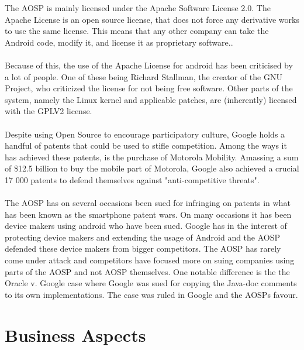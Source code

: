 \documentclass[conference]{IEEEtran}
\begin{document}
The AOSP is mainly licensed under the Apache Software License 2.0. The Apache License is an open source license, that does not force any derivative works to use the same license. This means that any other company can take the Android code, modify it, and license it as proprietary software.\cite{apache-license}. 
\\\\Because of this, the use of the Apache License for android has been criticised by a lot of people. One of these being Richard Stallman, the creator of the GNU Project, who criticized the license for not being free software.\cite{rms-android} Other parts of the system, namely the Linux kernel and applicable patches, are (inherently) licensed with the GPLV2 license.\cite{gplv2}\cite{android-licenses} 
\\\\Despite using Open Source to encourage participatory culture, Google holds a handful of patents that could be used to stifle competition.\cite{google-slide-unlock}\cite{google-radial-menu} Among the ways it has achieved these patents, is the purchase of Motorola Mobility. Amassing a sum of \$12.5 billion to buy the mobile part of Motorola, Google also achieved a crucial 17 000 patents to defend themselves against "anti-competitive threats".\cite{Goggin}
\\\\The AOSP has on several occasions been sued for infringing on patents in what has been known as the smartphone patent wars. On many occasions it has been device makers using android who have been sued.\cite{android-vApple} Google has in the interest of protecting device makers and extending the usage of Android and the AOSP defended these device makers from bigger competitors.\cite{google-helps} The AOSP has rarely come under attack and competitors have focused more on suing companies using parts of the AOSP and not AOSP themselves. One notable difference is the the Oracle v. Google case where Google was sued for copying the Java-doc comments to its own implementations.\cite{android-v-oracle} The case was ruled in Google and the AOSPs favour.


\section{Business Aspects}
\label{financial}
\end{document}
